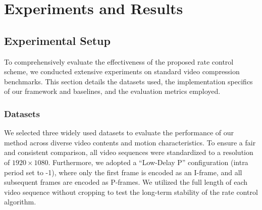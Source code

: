 
\chapter{Experiments and Results}

\section{Experimental Setup}

To comprehensively evaluate the effectiveness of the proposed rate control scheme, we conducted extensive experiments on standard video compression benchmarks. This section details the datasets used, the implementation specifics of our framework and baselines, and the evaluation metrics employed.

\subsection{Datasets}

We selected three widely used datasets to evaluate the performance of our method across diverse video contents and motion characteristics. To ensure a fair and consistent comparison, all video sequences were standardized to a resolution of $1920 \times 1080$. Furthermore, we adopted a ``Low-Delay P'' configuration (intra period set to -1), where only the first frame is encoded as an I-frame, and all subsequent frames are encoded as P-frames. We utilized the full length of each video sequence without cropping to test the long-term stability of the rate control algorithm.

